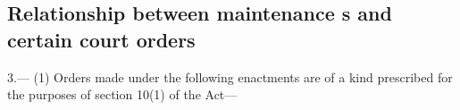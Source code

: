 \documentclass[12pt,a4paper]{article}
\begin{document}

\subsection[3. Relationship between maintenance \opt{oldrules}{assessment}\opt{newrules}{calculation}s and certain court orders]{\sloppy Relationship between maintenance s and certain court orders}

3.—%
%
%
%
%
%
%
(1) Orders made under the following enactments are of a kind prescribed for the purposes of section 10(1) of the Act—
\end{document}
